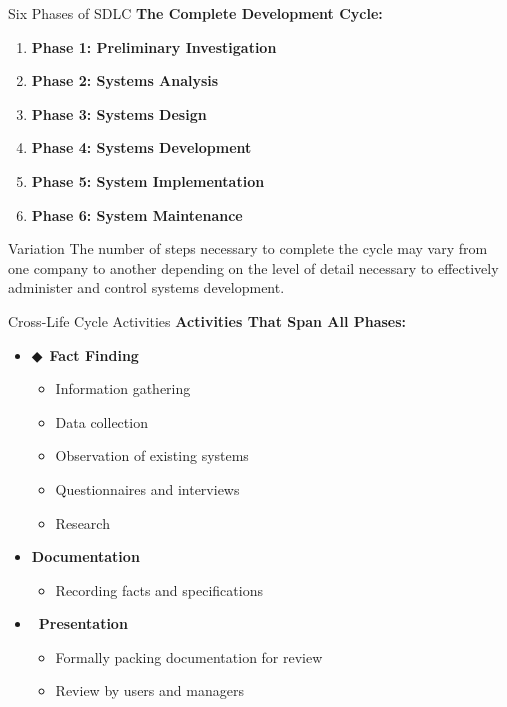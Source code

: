 \documentclass[aspectratio=169]{beamer}
\begin{document}
\begin{frame}{Six Phases of SDLC}
    \textbf{The Complete Development Cycle:}
    
    \begin{enumerate}
        \item \textbf{Phase 1: Preliminary Investigation}
        \item  \textbf{Phase 2: Systems Analysis}
        \item \textbf{Phase 3: Systems Design}
        \item \textbf{Phase 4: Systems Development}
        \item \textbf{Phase 5: System Implementation}
        \item \textbf{Phase 6: System Maintenance}
    \end{enumerate}
    
    \vspace{0.5cm}
    \begin{alertblock}{Variation}
        The number of steps necessary to complete the cycle may vary from one company to another depending on the level of detail necessary to effectively administer and control systems development.
    \end{alertblock}
\end{frame}

\begin{frame}{Cross-Life Cycle Activities}
    \textbf{Activities That Span All Phases:}
    
    \begin{itemize}
        \item ◆\, \textbf{Fact Finding}
        \begin{itemize}
            \item Information gathering
            \item Data collection
            \item Observation of existing systems
            \item Questionnaires and interviews
            \item Research
        \end{itemize}
        
        \item  \textbf{Documentation}
        \begin{itemize}
            \item Recording facts and specifications
        \end{itemize}
        
        \item\, \textbf{Presentation}
        \begin{itemize}
            \item Formally packing documentation for review
            \item Review by users and managers
        \end{itemize}
    \end{itemize}
\end{frame}
\end{document}
